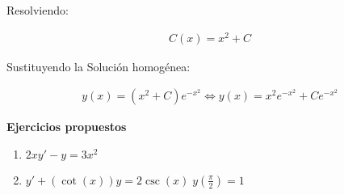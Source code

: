 Resolviendo:

\begin{equation*}
    \begin{gathered}
        C(x)=x^{2}+C
    \end{gathered}
\end{equation*}

Sustituyendo la Solución homogénea:

\begin{equation*}
    \begin{gathered}
        y(x)=\left(x^{2}+C\right)e^{-x^{2}}\Leftrightarrow y(x)=x^{2}e^{-x^{2}}+Ce^{-x^{2}}
    \end{gathered}
\end{equation*}

\textbf{Ejercicios propuestos}
\begin{enumerate}
  \item \(\displaystyle 2xy' -y=3x^{2}\)
  \item \(\displaystyle y'+\left(\cot(x)\right)y=2\csc(x)\;y\left(\frac{\pi}{2}\right)=1\)
\end{enumerate}